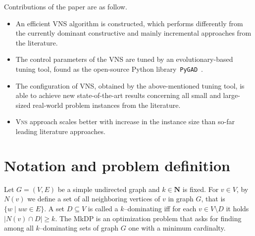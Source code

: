\documentclass[dvipsnames,format=sigconf,anonymous=true,review=true]{acmart}
\begin{document}
Contributions of the paper are as follow.
\begin{itemize}
	\item An efficient VNS algorithm is constructed, which performs differently from  the currently dominant constructive and mainly incremental approaches from the literature.
	
	\item The control parameters of the VNS are tuned by %
	an evolutionary-based tuning tool, found as the open-source Python library~\texttt{PyGAD}~\cite{gad2021pygad}.  
	\item The configuration of VNS, obtained by the above-mentioned tuning tool, is able to achieve new state-of-the-art results concerning all small and large-sized real-world problem instances from the literature. %
	\item  \textsc{Vns} approach scales better with increase in the instance size than so-far leading literature approaches. 
\end{itemize}

\section{Notation and problem definition }
    

    Let $G=(V,E)$ be a simple undirected graph and $k \in \mathbf{N}$ is fixed. For $v\in V$, by $N(v)$ we define a set of all neighboring vertices of $v$ in graph  $G$, that is $\{w \mid uw \in E\}$. A set $D \subseteq V$ is called a $k$--dominating iff for each $v\in V \setminus D$ it holds $|N(v) \cap D| \geq k$.  The MkDP is an optimization problem that asks for finding among all $k$--dominating sets of graph $G$ one with a minimum cardinalty. 
    
\end{document}
